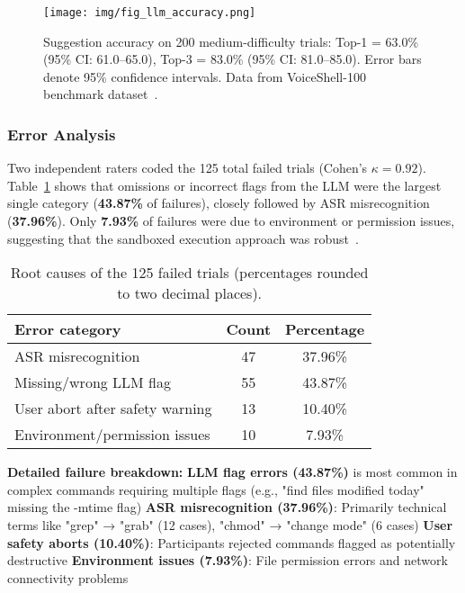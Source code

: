 \documentclass[a4paper,12pt]{article}
\begin{document}
\begin{figure}[H]
\centering
\texttt{[image: img/fig\_llm\_accuracy.png]}
\caption{Suggestion accuracy on 200 medium-difficulty trials: Top-1 = 63.0\% (95\% CI: 61.0–65.0), Top-3 = 83.0\% (95\% CI: 81.0–85.0). Error bars denote 95\% confidence intervals. Data from VoiceShell-100 benchmark dataset~\cite{ref26,ref27}.}
\label{fig:suggestionaccuracy}
\end{figure}

\subsubsection*{Error Analysis}
Two independent raters coded the 125 total failed trials (Cohen's $\kappa = 0.92$). Table~\ref{tab:fail-causes} shows that omissions or incorrect flags from the LLM were the largest single category (\textbf{43.87\%} of failures), closely followed by ASR misrecognition (\textbf{37.96\%}). Only \textbf{7.93\%} of failures were due to environment or permission issues, suggesting that the sandboxed execution approach was robust~\cite{ref4,ref12}.


\begin{table}[h!]
\centering
\begin{tabular}{lcc}
\toprule
\textbf{Error category} & \textbf{Count} & \textbf{Percentage} \\
\midrule
ASR misrecognition           & 47 & 37.96\% \\
Missing/wrong LLM flag       & 55 & 43.87\% \\
User abort after safety warning & 13 & 10.40\% \\
Environment/permission issues & 10 & 7.93\% \\
\bottomrule
\end{tabular}
\caption{Root causes of the 125 failed trials (percentages rounded to two decimal places).}
\label{tab:fail-causes}
\end{table}

\textbf{Detailed failure breakdown:}
\textbf{LLM flag errors (43.87\%)} is most common in complex commands requiring multiple flags (e.g., "find files modified today" missing the -mtime flag)
\textbf{ASR misrecognition (37.96\%)}: Primarily technical terms like "grep" → "grab" (12 cases), "chmod" → "change mode" (6 cases)
\textbf{User safety aborts (10.40\%)}: Participants rejected commands flagged as potentially destructive
\textbf{Environment issues (7.93\%)}: File permission errors and network connectivity problems
\end{document}
